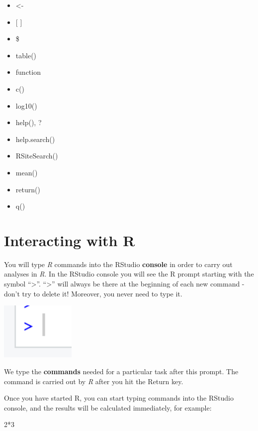 \documentclass[
]{book}
\newenvironment{Shaded}{\begin{snugshade}}{\end{snugshade}}
\newcommand{\DecValTok}[1]{\textcolor[rgb]{0.00,0.00,0.81}{#1}}
\newcommand{\SpecialCharTok}[1]{\textcolor[rgb]{0.00,0.00,0.00}{#1}}
\providecommand{\tightlist}{%
  \setlength{\itemsep}{0pt}\setlength{\parskip}{0pt}}
\begin{document}
\begin{itemize}
\tightlist
\item
  \textless-
\item
  {[} {]}
\item
  \$
\item
  table()
\item
  function
\item
  c()
\item
  log10()
\item
  help(), ?
\item
  help.search()
\item
  RSiteSearch()
\item
  mean()
\item
  return()
\item
  q()
\end{itemize}

\hypertarget{interacting-with-r}{%
\section{Interacting with R}\label{interacting-with-r}}

You will type \emph{R} commands into the RStudio \textbf{console} in order to carry out analyses in \emph{R}. In the RStudio console you will see the R prompt starting with the symbol ``\textgreater{}''. ``\textgreater{}'' will always be there at the beginning of each new command - don't try to delete it! Moreover, you never need to type it.

\includegraphics[width=1.42in]{images/R_cursor}

We type the \textbf{commands} needed for a particular task after this prompt. The command is carried out by \emph{R} after you hit the Return key.

Once you have started R, you can start typing commands into the RStudio console, and the results will be calculated immediately, for example:

\begin{Shaded}
\begin{Highlighting}[]
\DecValTok{2}\SpecialCharTok{*}\DecValTok{3}
\end{Highlighting}
\end{Shaded}
\end{document}
